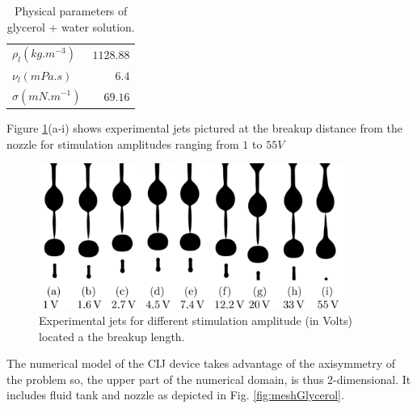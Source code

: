 \documentclass[twocolumn,10pt]{asme2ej}
\begin{document}
\begin{table}
    \begin{center}
        \begin{tabular}{lr}
            \hline
            $\rho_{l} (kg.m^{-3})$ & $1128.88$\\
            $\nu_{l} (mPa.s)$ & $6.4$\\
            $\sigma (mN.m^{-1})$ & $69.16$\\
            \hline
        \end{tabular}
    \end{center}
    
    \caption{\label{tab:parametersGlycerol} Physical parameters of glycerol + water solution.}
\end{table}

Figure \ref{fig:glycerolCIJExp}(a-i) shows experimental jets pictured at the breakup distance from the nozzle for stimulation amplitudes ranging from $1$ to $55V$

\begin{figure}[t]
    \centering
    \includegraphics[width=10cm]{Glycerol/gouttes_exp.png}
    \caption{Experimental jets for different stimulation amplitude (in Volts) located a the breakup length.}
    \label{fig:glycerolCIJExp}
\end{figure}

The numerical model of the CIJ device takes advantage of the axisymmetry of the problem so, the upper part of the numerical domain, is thus 2-dimensional. It includes fluid tank and nozzle as depicted in Fig. \ref{fig:meshGlycerol}. 
\end{document}
